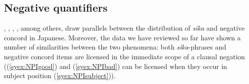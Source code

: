 \documentclass[output=paper]{langscibook}
\begin{document}




    
    


    





\subsection{Negative quantifiers}\label{sysc:negq}

\citet{aoyagi94}, \citet{kawahara08a}, \citet{tanaka97a}, \citet{yoshimura2007b}, among others, draw parallels between the distribution of \emph{sika} and negative concord in Japanese.
Moreover, the data we have reviewed so far have shown a number of similarities between the two phenomena: both \emph{sika}-phrases and negative concord items are licensed in the immediate scope of a clausal negation ((\ref{syex:NPIgood}) and (\ref{syex:NPIbad}) can be licensed when they occur in subject position (\ref{syex:NPIsubject})).
\end{document}
